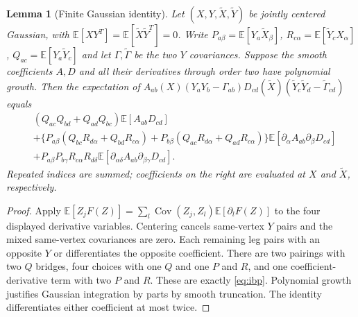 \documentclass[11pt]{article}
\newtheorem{lemma}[theorem]{Lemma}
\newcommand{\E}{\mathbb E}
\begin{document}
\begin{lemma}[Finite Gaussian identity]\label{lem:ibp}
Let $(X,Y,\widetilde X,\widetilde Y)$ be jointly centered Gaussian, with
$\E[XY^T]=\E[\widetilde X\widetilde Y^T]=0$.
Write $P_{a\beta}=\E[Y_a\widetilde X_\beta]$,
$R_{c\alpha}=\E[\widetilde Y_cX_\alpha]$,
$Q_{ac}=\E[Y_a\widetilde Y_c]$ and let $\Gamma,\widetilde\Gamma$
be the two $Y$ covariances. Suppose the smooth coefficients $A,D$ and all
their derivatives through order two have polynomial growth. Then
the expectation of
$A_{ab}(X)(Y_aY_b-\Gamma_{ab})D_{cd}(\widetilde X)
(\widetilde Y_c\widetilde Y_d-\widetilde\Gamma_{cd})$ equals
\begin{align}\label{eq:ibp}
 &(Q_{ac}Q_{bd}+Q_{ad}Q_{bc})\E[A_{ab}D_{cd}]\nonumber\\
 &+\{P_{a\beta}(Q_{bc}R_{d\alpha}+Q_{bd}R_{c\alpha})
       +P_{b\beta}(Q_{ac}R_{d\alpha}+Q_{ad}R_{c\alpha})\}
       \E[\partial_\alpha A_{ab}\partial_\beta D_{cd}]\nonumber\\
 &+P_{a\beta}P_{b\gamma}R_{c\alpha}R_{d\delta}
       \E[\partial_{\alpha\delta}A_{ab}\partial_{\beta\gamma}D_{cd}].
\end{align}
Repeated indices are summed; coefficients on the right are evaluated at
$X$ and $\widetilde X$, respectively.
\end{lemma}
\begin{proof}
Apply $\E[Z_jF(Z)]=\sum_l\operatorname{Cov}(Z_j,Z_l)\E[\partial_lF(Z)]$
to the four displayed derivative variables. Centering cancels same-vertex
$Y$ pairs and the mixed same-vertex covariances are zero. Each remaining
leg pairs with an opposite $Y$ or differentiates the opposite coefficient.
There are two pairings with two $Q$ bridges, four choices with one $Q$ and
one $P$ and $R$, and one coefficient-derivative term with two $P$ and $R$.
These are exactly \eqref{eq:ibp}. Polynomial growth justifies Gaussian
integration by parts by smooth truncation. The identity differentiates
either coefficient at most twice.
\end{proof}
\end{document}
